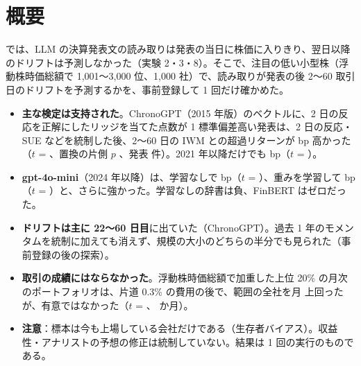 \chapter*{概要}

\SP{} では、LLM の決算発表文の読み取りは発表の当日に株価に入りきり、翌日以降のドリフトは予測しなかった（実験 2・3・8）。そこで、注目の低い小型株（浮動株時価総額で 1,001〜3,000 位、1,000 社）で、読み取りが発表の後 2〜60 取引日のドリフトを予測するかを、事前登録して 1 回だけ確かめた。

\begin{keybox}[要点]
\begin{itemize}
\item \textbf{主な検定は支持された}。ChronoGPT（2015 年版）のベクトルに、2 日の反応を正解にしたリッジを当てた点数が 1 標準偏差高い発表は、2 日の反応・SUE などを統制した後、2〜60 日の IWM との超過リターンが  bp 高かった（$t$ = 、置換の片側 $p$ 、発表  件）。2021 年以降だけでも  bp（$t$ = ）。
\item \textbf{gpt-4o-mini}（2024 年以降）は、学習なしで  bp（$t$ = ）、重みを学習して  bp（$t$ = ）と、さらに強かった。学習なしの辞書は負、FinBERT はゼロだった。
\item \textbf{ドリフトは主に 22〜60 日目}に出ていた（ChronoGPT）。過去 1 年のモメンタムを統制に加えても消えず、規模の大小のどちらの半分でも見られた（事前登録の後の探索）。
\item \textbf{取引の成績にはならなかった}。浮動株時価総額で加重した上位 20\% の月次のポートフォリオは、片道 0.3\% の費用の後で、範囲の全社を月  上回ったが、有意ではなかった（$t$ = 、 か月）。

\item \textbf{注意}：標本は今も上場している会社だけである（生存者バイアス）。収益性・アナリストの予想の修正は統制していない。結果は 1 回の実行のものである。
\end{itemize}
\end{keybox}
